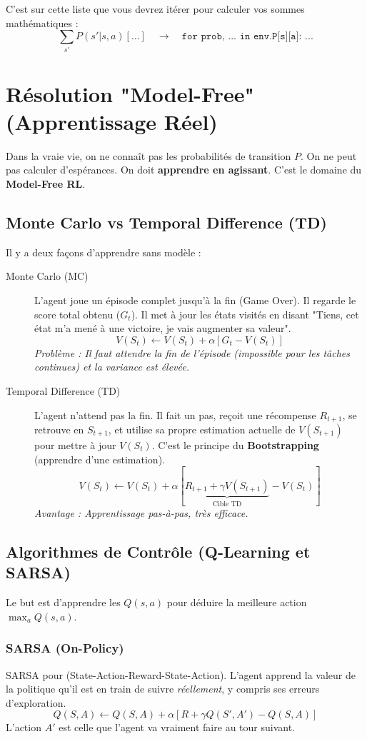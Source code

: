 \documentclass[a4paper,12pt]{report}
\begin{document}
C'est sur cette liste que vous devrez itérer pour calculer vos sommes mathématiques :
\[ \sum_{s'} P(s'|s,a) [\dots] \quad \longrightarrow \quad \texttt{for prob, ... in env.P[s][a]: ...} \]

\chapter{Résolution "Model-Free" (Apprentissage Réel)}

Dans la vraie vie, on ne connaît pas les probabilités de transition $P$. On ne peut pas calculer d'espérances. On doit \textbf{apprendre en agissant}.
C'est le domaine du \textbf{Model-Free RL}.

\section{Monte Carlo vs Temporal Difference (TD)}
Il y a deux façons d'apprendre sans modèle :

\begin{description}
    \item[Monte Carlo (MC)] L'agent joue un épisode complet jusqu'à la fin (Game Over). Il regarde le score total obtenu ($G_t$). Il met à jour les états visités en disant "Tiens, cet état m'a mené à une victoire, je vais augmenter sa valeur".
    \[ V(S_t) \leftarrow V(S_t) + \alpha [ G_t - V(S_t) ] \]
    \textit{Problème : Il faut attendre la fin de l'épisode (impossible pour les tâches continues) et la variance est élevée.}

    \item[Temporal Difference (TD)] L'agent n'attend pas la fin. Il fait un pas, reçoit une récompense $R_{t+1}$, se retrouve en $S_{t+1}$, et utilise sa propre estimation actuelle de $V(S_{t+1})$ pour mettre à jour $V(S_t)$. C'est le principe du \textbf{Bootstrapping} (apprendre d'une estimation).
    \[ V(S_t) \leftarrow V(S_t) + \alpha [ \underbrace{R_{t+1} + \gamma V(S_{t+1})}_{\text{Cible TD}} - V(S_t) ] \]
    \textit{Avantage : Apprentissage pas-à-pas, très efficace.}
\end{description}

\section{Algorithmes de Contrôle (Q-Learning et SARSA)}
Le but est d'apprendre les $Q(s,a)$ pour déduire la meilleure action $\max_a Q(s,a)$.

\subsection{SARSA (On-Policy)}
SARSA pour (State-Action-Reward-State-Action).
L'agent apprend la valeur de la politique qu'il est en train de suivre \textit{réellement}, y compris ses erreurs d'exploration.
\[ Q(S,A) \leftarrow Q(S,A) + \alpha [ R + \gamma Q(S', A') - Q(S,A) ] \]
L'action $A'$ est celle que l'agent va vraiment faire au tour suivant.
\end{document}
